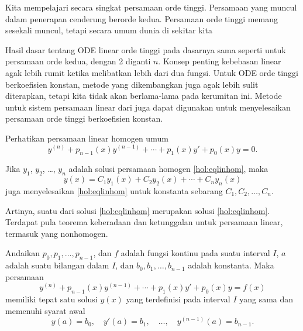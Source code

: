 %

Kita mempelajari secara singkat persamaan orde tinggi. Persamaan yang muncul dalam penerapan cenderung berorde kedua. Persamaan orde tinggi memang sesekali muncul, tetapi secara umum dunia di sekitar kita 

Hasil dasar tentang ODE linear orde tinggi pada dasarnya sama seperti untuk persamaan orde kedua, dengan 2 diganti $n$. Konsep penting kebebasan linear agak lebih rumit ketika melibatkan lebih dari dua fungsi. Untuk ODE orde tinggi berkoefisien konstan, metode yang dikembangkan juga agak lebih sulit diterapkan, tetapi kita tidak akan berlama-lama pada kerumitan ini. Metode untuk sistem persamaan linear dari  juga dapat digunakan untuk menyelesaikan persamaan orde tinggi berkoefisien konstan.

Perhatikan persamaan linear homogen umum
\begin{equation} \label{hol:eqlinhom}
y^{(n)} + p_{n-1}(x)y^{(n-1)} + \cdots + p_1(x) y' + p_0(x) y = 0 .
\end{equation}

\begin{theorem}[Superposisi]
Jika $y_1$, $y_2$, \ldots, $y_n$ adalah solusi persamaan homogen \eqref{hol:eqlinhom}, maka
\begin{equation*}
y(x) = C_1 y_1(x) + C_2 y_2(x) + \cdots + C_n y_n(x)
\end{equation*}
juga menyelesaikan \eqref{hol:eqlinhom} untuk konstanta sebarang $C_1, C_2, \ldots, C_n$.
\end{theorem}

Artinya, suatu \emph{} dari solusi \eqref{hol:eqlinhom} merupakan solusi \eqref{hol:eqlinhom}. Terdapat pula teorema keberadaan dan ketunggalan untuk persamaan linear, termasuk yang nonhomogen.

\begin{theorem}
Andaikan $p_0, p_1, \ldots, p_{n-1}$, dan $f$ adalah fungsi kontinu pada suatu interval $I$, $a$ adalah suatu bilangan dalam $I$, dan $b_0, b_1, \ldots, b_{n-1}$ adalah konstanta. Maka persamaan
\begin{equation*} %
y^{(n)} + p_{n-1}(x)y^{(n-1)} + \cdots + p_1(x) y' + p_0(x) y = f(x)
\end{equation*}
memiliki tepat satu solusi $y(x)$ yang terdefinisi pada interval $I$ yang sama dan memenuhi syarat awal
\begin{equation*}
y(a) = b_0, \quad y'(a) = b_1, \quad \ldots, \quad y^{(n-1)}(a) = b_{n-1} .
\end{equation*}
\end{theorem}

